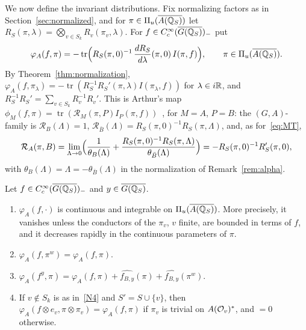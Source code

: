 We now define the invariant distributions. Fix normalizing factors as in
Section~\ref{sec:normalized}, and for $\pi\in\Pi_u(\overline{A(\mathbb{Q}_S)})$ let
$R_S(\pi,\lambda)=\bigotimes_{v\in S_k}R_v(\pi_v,\lambda)$. For
$f\in C_c^\infty(\overline{G(\mathbb{Q}_S)})_-$ put
\begin{equation}\label{eq:phiA}
\varphi_A(f,\pi)=-\operatorname{tr}\Bigl(R_S(\pi,0)^{-1}\,\frac{dR_S}
{d\lambda}(\pi,0)\,I(\pi,f)\Bigr),\qquad\pi\in\Pi_u(\overline{A(\mathbb{Q}_S)}).
\end{equation}
By Theorem~\ref{thm:normalization}, $\varphi_A(f,\pi_\lambda)=
-\operatorname{tr}(R_S^{-1}R_S'(\pi,\lambda)I(\pi_\lambda,f))$ for
$\lambda\in i\mathbb{R}$, and $R_S^{-1}R_S'=\sum_{v\in S_k}R_v^{-1}R_v'$. This is
Arthur's map $\phi_M(f,\pi)=\operatorname{tr}(\mathcal R_M(\pi,P)I_P(\pi,
f))$~\cite[\S7]{Ar81}, \cite{Ar88b} for $M=A$, $P=B$: the $(G,A)$-family is
$\mathcal R_B(\Lambda)=1$, $\mathcal R_{\bar B}(\Lambda)=R_S(\pi,0)^{-1}
R_S(\pi,\Lambda)$, and, as for~\eqref{eq:MT},
\[
\mathcal R_A(\pi,B)=\lim_{\Lambda\to0}\Bigl(\frac{1}{\theta_B(\Lambda)}+
\frac{R_S(\pi,0)^{-1}R_S(\pi,\Lambda)}{\theta_{\bar B}(\Lambda)}\Bigr)
=-R_S(\pi,0)^{-1}R_S'(\pi,0),
\]
with $\theta_B(\Lambda)=\Lambda=-\theta_{\bar B}(\Lambda)$ in the
normalization of Remark~\ref{rem:alpha}.

\begin{proposition}\label{prop:phiA}
Let $f\in C_c^\infty(\overline{G(\mathbb{Q}_S)})_-$ and $y\in\overline{G(\mathbb{Q}_S)}$.
\begin{enumerate}[label=(\alph*)]
\item $\varphi_A(f,\cdot)$ is continuous and integrable on $\Pi_u(\overline{A(\mathbb{Q}_S)})$.
  More precisely, it vanishes unless the conductors of the $\pi_v$, $v$
  finite, are bounded in terms of $f$, and it decreases rapidly in the
  continuous parameters of $\pi$.
\item $\varphi_A(f,\pi^w)=\varphi_A(f,\pi)$.
\item $\varphi_A(f^y,\pi)=\varphi_A(f,\pi)+\widehat{f_{B,y}}(\pi)+
  \widehat{f_{B,y}}(\pi^w)$.
\item If $v\notin S_k$ is as in~\ref{N4} and $S'=S\cup\{v\}$, then
  $\varphi_A(f\otimes e_v,\pi\otimes\pi_v)=\varphi_A(f,\pi)$ if $\pi_v$ is
  trivial on $A(\mathcal{O}_v)^*$, and $=0$ otherwise.
\end{enumerate}
\end{proposition}

